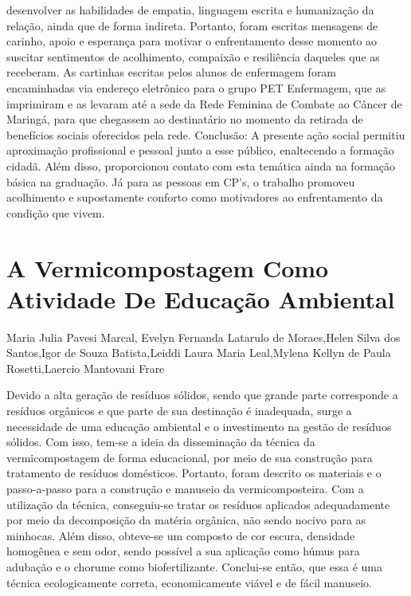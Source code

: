 desenvolver as habilidades de empatia, linguagem escrita e humanização da relação, ainda que
de forma indireta. Portanto, foram escritas mensagens de carinho, apoio e esperança para motivar
o enfrentamento desse momento ao suscitar sentimentos de acolhimento, compaixão e resiliência
daqueles que as receberam. As cartinhas escritas pelos alunos de enfermagem foram
encaminhadas via endereço eletrônico para o grupo PET Enfermagem, que as imprimiram e as
levaram até a sede da Rede Feminina de Combate ao Câncer de Maringá, para que chegassem ao
destinatário no momento da retirada de benefícios sociais oferecidos pela rede. Conclusão: A
presente ação social permitiu aproximação profissional e pessoal junto a esse público,
enaltecendo a formação cidadã. Além disso, proporcionou contato com esta temática ainda na
formação básica na graduação. Já para as pessoas em CP’s, o trabalho promoveu acolhimento e
supostamente conforto como motivadores ao enfrentamento da condição que vivem.




\section*{A Vermicompostagem Como Atividade De Educação Ambiental}

Maria Julia Pavesi Marcal, Evelyn Fernanda Latarulo de Moraes,Helen Silva dos Santos,Igor de Souza Batista,Leiddi Laura Maria Leal,Mylena Kellyn de Paula Rosetti,Laercio Mantovani Frare

Devido a alta geração de resíduos sólidos, sendo que grande parte corresponde a resíduos orgânicos e que parte de sua destinação é inadequada, surge a necessidade de uma educação ambiental e o investimento na gestão de resíduos sólidos. Com isso, tem-se a ideia da disseminação da técnica da vermicompostagem de forma educacional, por meio de sua construção para tratamento de  resíduos domésticos. Portanto, foram descrito os materiais e o passo-a-passo para a construção e manuseio da vermicomposteira. Com a utilização da técnica, conseguiu-se tratar os resíduos aplicados adequadamente por meio da decomposição da matéria orgânica, não sendo nocivo para as minhocas. Além disso, obteve-se um  composto de cor escura, densidade homogênea e sem odor, sendo possível a sua aplicação como húmus para adubação e o chorume como biofertilizante. Conclui-se então, que essa é uma técnica ecologicamente correta, economicamente viável e de fácil manuseio. 

